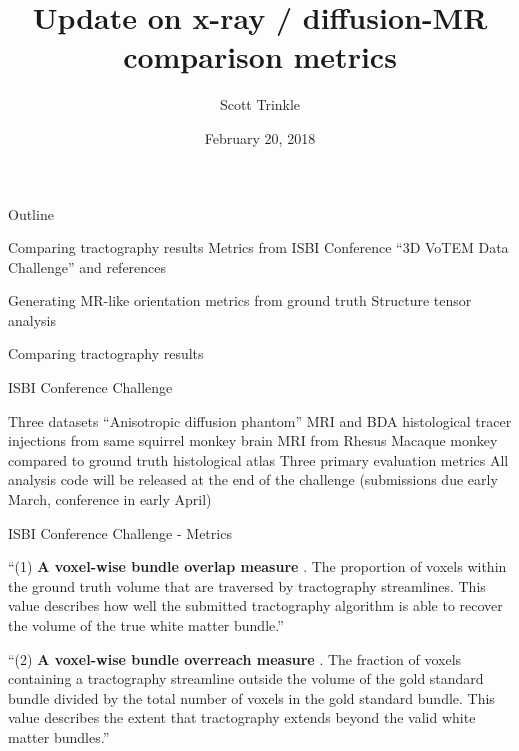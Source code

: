 \documentclass[presentation, 10pt]{beamer}
\author{Scott Trinkle}
\date{February 20, 2018}
\title{Update on x-ray / diffusion-MR comparison metrics}
\begin{document}
\frame{\titlepage}

\begin{frame}{Outline}

  \begin{outline}
    \1 Comparing tractography results
    \2 Metrics from ISBI Conference ``3D VoTEM Data Challenge'' and references

    \1 Generating MR-like orientation metrics from ground truth
    \2 Structure tensor analysis
  \end{outline}

\end{frame}

\begin{frame}
  \centering
  \Large Comparing tractography results
\end{frame}

\begin{frame}{ISBI Conference Challenge}

  \begin{outline}
    \1 Three datasets
    \2 ``Anisotropic diffusion phantom''
    \2 MRI and BDA histological tracer injections from same squirrel monkey brain
    \2 MRI from Rhesus Macaque monkey compared to ground truth histological atlas
    \1 Three primary evaluation metrics
    \1 All analysis code will be released at the end of the challenge (submissions due early March, conference in early April)
  \end{outline}
\end{frame}


\begin{frame}{ISBI Conference Challenge - Metrics}
  
\begin{outline}
  \1 ``(1) \textbf{A voxel-wise bundle overlap measure} \cite{ning}. The proportion of voxels within the ground truth volume that are traversed by tractography streamlines. This value describes how well the submitted tractography algorithm is able to recover the volume of the true white matter bundle.''
  
  \1 ``(2) \textbf{A voxel-wise bundle overreach measure} \cite{ning}. The fraction of voxels containing a tractography streamline outside the volume of the gold standard bundle divided by the total number of voxels in the gold standard bundle. This value describes the extent that tractography extends beyond the valid white matter bundles.''
\end{outline}

\end{frame}
\end{document}
